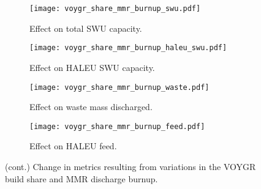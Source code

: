\begin{figure}
    \ContinuedFloat  
    
    \begin{subfigure}[h!]{0.48\textwidth}
        \centering
        \texttt{[image: voygr\_share\_mmr\_burnup\_swu.pdf]}
        \caption{Effect on total SWU capacity.}
        \label{fig:voygr_share_mmr_burnup_swu}
    \end{subfigure}
    \hfill
    \begin{subfigure}[h!]{0.48\textwidth}
        \centering
        \texttt{[image: voygr\_share\_mmr\_burnup\_haleu\_swu.pdf]}
        \caption{Effect on HALEU SWU capacity.}
        \label{fig:voygr_share_mmr_burnup_haleu_swu}
    \end{subfigure}  
    \begin{subfigure}[h!]{0.48\textwidth}
        \centering
        \texttt{[image: voygr\_share\_mmr\_burnup\_waste.pdf]}
        \caption{Effect on waste mass discharged.}
        \label{fig:voygr_share_mmr_burnup_waste}
    \end{subfigure}
    \hfill
    \begin{subfigure}[h!]{0.48\textwidth}
        \centering
        \texttt{[image: voygr\_share\_mmr\_burnup\_feed.pdf]}
        \caption{Effect on HALEU feed.}
        \label{fig:voygr_share_mmr_burnup_feed}
    \end{subfigure}
    \caption{(cont.) Change in metrics resulting from variations in the 
    VOYGR build share and MMR discharge burnup.}
    \label{fig:voygr_share_mmr_burnup}
\end{figure}